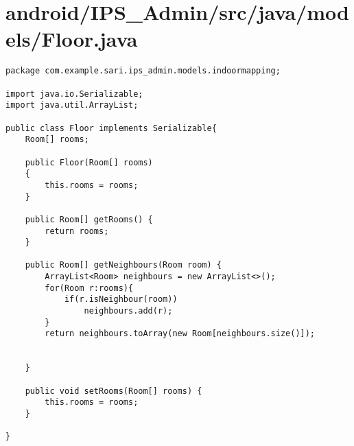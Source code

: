 \section{android/IPS\_Admin/src/java/models/Floor.java}
\begin{lstlisting}package com.example.sari.ips_admin.models.indoormapping;

import java.io.Serializable;
import java.util.ArrayList;

public class Floor implements Serializable{
    Room[] rooms;

    public Floor(Room[] rooms)
    {
        this.rooms = rooms;
    }

    public Room[] getRooms() {
        return rooms;
    }

    public Room[] getNeighbours(Room room) {
        ArrayList<Room> neighbours = new ArrayList<>();
        for(Room r:rooms){
            if(r.isNeighbour(room))
                neighbours.add(r);
        }
        return neighbours.toArray(new Room[neighbours.size()]);


    }

    public void setRooms(Room[] rooms) {
        this.rooms = rooms;
    }

}
\end{lstlisting}
\newpage

